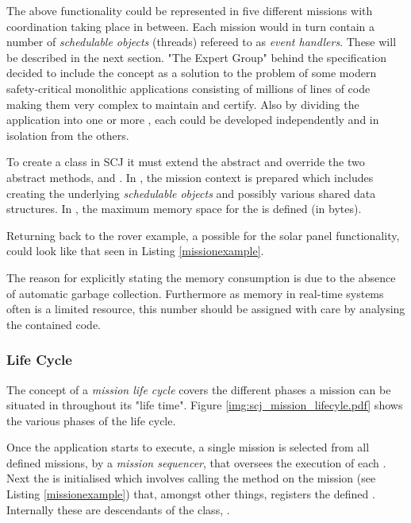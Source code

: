 The above functionality could be represented in five different missions with coordination taking place in between. Each mission would in turn contain a number of \textit{schedulable objects} (threads) refereed to as \textit{event handlers}. These will be described in the next section. "The Expert Group" behind the specification decided to include the  concept as a solution to the problem of some modern safety-critical monolithic applications consisting of millions of lines of code making them very complex to maintain and certify. Also by dividing the application into one or more , each  could be developed independently and in isolation from the others.  

To create a  class in SCJ it must extend the abstract  and override the two abstract methods,  and . In , the mission context is prepared which includes creating the underlying \textit{schedulable objects} and possibly various shared data structures. In , the maximum memory space for the  is defined (in bytes).

Returning back to the rover example, a possible  for the solar panel functionality, could look like that seen in Listing \ref{missionexample}.



The reason for explicitly stating the memory consumption is due to the absence of automatic garbage collection. Furthermore as memory in real-time systems often is a limited resource, this number should be assigned with care by analysing the contained code.

\subsubsection{Life Cycle}
The concept of a \textit{mission life cycle} covers the different phases a mission can be situated in throughout its "life time". Figure \ref{img:scj_mission_lifecyle.pdf} shows the various phases of the life cycle.


Once the application starts to execute, a single mission is selected from all defined missions, by a \textit{mission sequencer}, that oversees the execution of each . Next the  is initialised which involves calling the  method on the mission (see Listing \ref{missionexample}) that, amongst other things, registers the defined . Internally these are descendants of the class, . 

